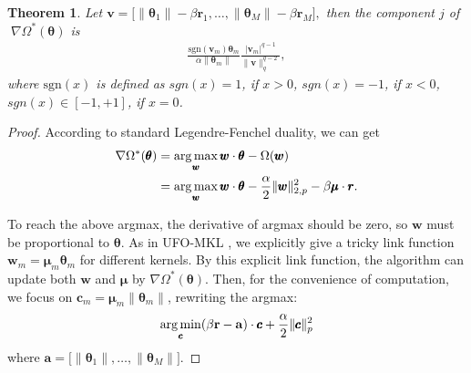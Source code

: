 \documentclass{article}
\newcommand{\argmax}{\operatornamewithlimits{arg\,max}}
\newcommand{\argmin}{\operatornamewithlimits{arg\,min}}
\newtheorem{theorem}{Theorem}
\begin{document}
 \begin{theorem}
\label{theorem-fenchel-dual}
Let
$
    \pmb{v}=\Big[\|\pmb{\theta}_1\|-\beta\mathbf{r}_1,\ldots,
    \|\pmb{\theta}_M\|-\beta\mathbf{r}_M\Big],
$
then the component $j$ of $\;\nabla\Omega^\ast(\pmb{\theta})$ is
\begin{align*}
\frac{\mathrm{sgn}(\pmb{v}_m) \pmb{\theta}_m}{\alpha\|\pmb{\theta}_m\|}
       \frac{|\pmb{v}_m|^{q-1}}{\|\pmb{v}\|_q^{q-2}},
\end{align*}
where $\mathrm{sgn}(x)$ is defined as
$sgn(x)=1$, if $x>0$, $sgn(x)=-1$, if $x<0$,
$sgn(x)\in[-1,+1]$, if $x=0$.
\end{theorem}

\begin{proof}
According to standard Legendre-Fenchel duality, we can get
\begin{align*}
\nabla\Omega^*(\pmb{\theta})&=\argmax\limits_{\pmb{w}} \pmb{w} \cdot \pmb{\theta} - \Omega(\pmb{w})\\
&=\argmax\limits_{\pmb{w}} \pmb{w} \cdot \pmb{\theta}
-\frac{\alpha}{2}\|\pmb{w}\|_{2,p}^2
-\beta\pmb{\mu}\cdot\pmb{r}.
\end{align*}

To reach the above argmax, the derivative of argmax should be zero, so $\pmb{w}$ must be proportional to $\pmb{\theta}$. As in UFO-MKL \cite{OrabonaL11}, we explicitly give a tricky link function $\pmb{w}_m=\pmb{\mu}_m\pmb{\theta}_m$ for different kernels. By this explicit link function, the algorithm can update both $\pmb{w}$ and $\pmb{\mu}$ by $\nabla\Omega^\ast(\pmb{\theta})$. Then, for the convenience of computation, we focus on $\pmb{c}_m=\pmb{\mu}_m\|\pmb{\theta}_m\|$, rewriting the argmax:
\begin{align}
    \label{lp-regularization}
    \argmin \limits_{\pmb{c}} (\beta\mathbf{r} - \mathbf{a})\cdot\pmb{c}+\frac{\alpha}{2}\|\pmb{c}\|_p^2
\end{align}
where $\mathbf{a}=\Big[\|\pmb{\theta}_1\|,\ldots, \|\pmb{\theta}_M\|\Big]$.


\end{proof}
\end{document}
